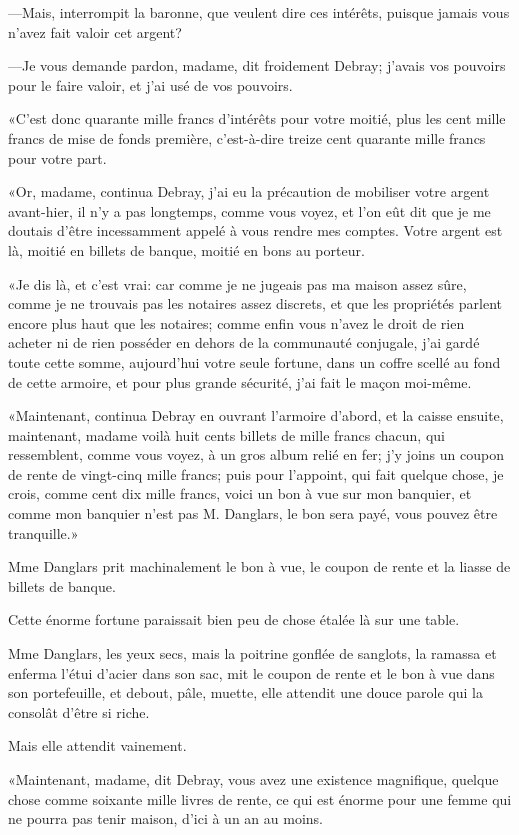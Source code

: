 —Mais, interrompit la baronne, que veulent dire ces intérêts, puisque jamais vous n'avez fait valoir cet argent? 

—Je vous demande pardon, madame, dit froidement Debray; j'avais vos pouvoirs pour le faire valoir, et j'ai usé de vos pouvoirs. 

«C'est donc quarante mille francs d'intérêts pour votre moitié, plus les cent mille francs de mise de fonds première, c'est-à-dire treize cent quarante mille francs pour votre part. 

«Or, madame, continua Debray, j'ai eu la précaution de mobiliser votre argent avant-hier, il n'y a pas longtemps, comme vous voyez, et l'on eût dit que je me doutais d'être incessamment appelé à vous rendre mes comptes. Votre argent est là, moitié en billets de banque, moitié en bons au porteur. 

«Je dis là, et c'est vrai: car comme je ne jugeais pas ma maison assez sûre, comme je ne trouvais pas les notaires assez discrets, et que les propriétés parlent encore plus haut que les notaires; comme enfin vous n'avez le droit de rien acheter ni de rien posséder en dehors de la communauté conjugale, j'ai gardé toute cette somme, aujourd'hui votre seule fortune, dans un coffre scellé au fond de cette armoire, et pour plus grande sécurité, j'ai fait le maçon moi-même. 

«Maintenant, continua Debray en ouvrant l'armoire d'abord, et la caisse ensuite, maintenant, madame voilà huit cents billets de mille francs chacun, qui ressemblent, comme vous voyez, à un gros album relié en fer; j'y joins un coupon de rente de vingt-cinq mille francs; puis pour l'appoint, qui fait quelque chose, je crois, comme cent dix mille francs, voici un bon à vue sur mon banquier, et comme mon banquier n'est pas M. Danglars, le bon sera payé, vous pouvez être tranquille.» 

Mme Danglars prit machinalement le bon à vue, le coupon de rente et la liasse de billets de banque. 

Cette énorme fortune paraissait bien peu de chose étalée là sur une table. 

Mme Danglars, les yeux secs, mais la poitrine gonflée de sanglots, la ramassa et enferma l'étui d'acier dans son sac, mit le coupon de rente et le bon à vue dans son portefeuille, et debout, pâle, muette, elle attendit une douce parole qui la consolât d'être si riche. 

Mais elle attendit vainement. 

«Maintenant, madame, dit Debray, vous avez une existence magnifique, quelque chose comme soixante mille livres de rente, ce qui est énorme pour une femme qui ne pourra pas tenir maison, d'ici à un an au moins. 

